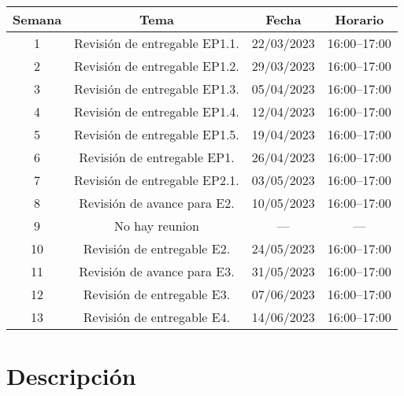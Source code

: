 \documentclass{article}
\begin{document}
\begin{center}
    \begin{tabular}{c c c c}
        \toprule
        Semana & Tema & Fecha & Horario \\
        \midrule
        1 & Revisión de entregable EP1.1. & 22/03/2023 & 16:00--17:00 \\
        \midrule
        2 & Revisión de entregable EP1.2. & 29/03/2023 & 16:00--17:00 \\
        \midrule
        3 & Revisión de entregable EP1.3. & 05/04/2023 & 16:00--17:00 \\
        \midrule
        4 & Revisión de entregable EP1.4. & 12/04/2023 & 16:00--17:00 \\
        \midrule
        5 & Revisión de entregable EP1.5. & 19/04/2023 & 16:00--17:00 \\
        \midrule
        6 & Revisión de entregable EP1. & 26/04/2023 & 16:00--17:00 \\
        \midrule
        7 & Revisión de entregable EP2.1. & 03/05/2023 & 16:00--17:00 \\
        \midrule
        8 & Revisión de avance para E2. & 10/05/2023 & 16:00--17:00 \\
        \midrule
        9 & No hay reunion & --- & --- \\
        \midrule
        10 & Revisión de entregable E2. & 24/05/2023 & 16:00--17:00 \\
        \midrule
        11 & Revisión de avance para E3. & 31/05/2023 & 16:00--17:00 \\
        \midrule
        12 & Revisión de entregable E3. & 07/06/2023 & 16:00--17:00 \\
        \midrule
        13 & Revisión de entregable E4. & 14/06/2023 & 16:00--17:00 \\
        \bottomrule
    \end{tabular}
\end{center}

\section{Descripción}
\end{document}
